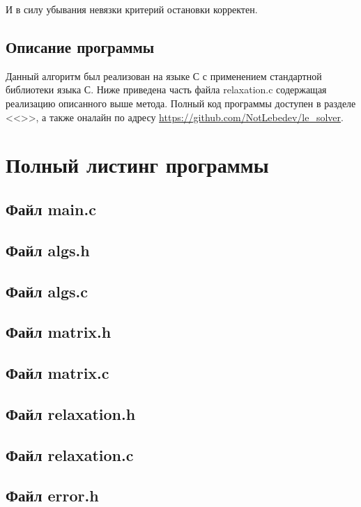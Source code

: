 \documentclass[a4paper,12pt,titlepage,finall]{article}
\begin{document}
И в силу убывания невязки критерий остановки корректен.
\subsection{Описание программы}
Данный алгоритм был реализован на языке С с применением стандартной библиотеки языка С. Ниже приведена часть файла relaxation.c содержащая реализацию описанного выше метода. Полный код программы доступен в разделе <<>>, а также оналайн по адресу \url{https://github.com/NotLebedev/le_solver}.



\newpage
\section{Полный листинг программы} \label{source}

\subsection{Файл main.c}

\subsection{Файл algs.h}

\subsection{Файл algs.c}

\subsection{Файл matrix.h}

\subsection{Файл matrix.c}

\subsection{Файл relaxation.h}

\subsection{Файл relaxation.c}

\subsection{Файл error.h}

\end{document}
